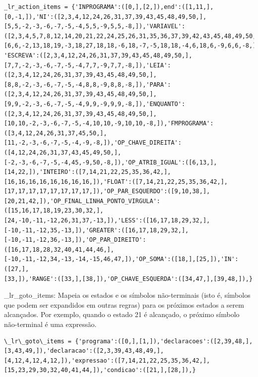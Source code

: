 \documentclass[a4paper,12pt]{article}
\begin{document}
\begin{Verbatim}
_lr_action_items = {'INPROGRAMA':([0,],[2,]),end':([1,11,],
[0,-1,]),'NI':([2,3,4,12,24,26,31,37,39,43,45,48,49,50,],
[5,5,-2,-3,-6,-7,-5,-4,5,5,-9,5,5,-8,]),'VARIAVEL':
([2,3,4,5,7,8,12,14,20,21,22,24,25,26,31,35,36,37,39,42,43,45,48,49,50,],
[6,6,-2,13,18,19,-3,18,27,18,18,-6,18,-7,-5,18,18,-4,6,18,6,-9,6,6,-8,]),
'ESCREVA':([2,3,4,12,24,26,31,37,39,43,45,48,49,50,],
[7,7,-2,-3,-6,-7,-5,-4,7,7,-9,7,7,-8,]),'LEIA':
([2,3,4,12,24,26,31,37,39,43,45,48,49,50,],
[8,8,-2,-3,-6,-7,-5,-4,8,8,-9,8,8,-8,]),'PARA':
([2,3,4,12,24,26,31,37,39,43,45,48,49,50,],
[9,9,-2,-3,-6,-7,-5,-4,9,9,-9,9,9,-8,]),'ENQUANTO':
([2,3,4,12,24,26,31,37,39,43,45,48,49,50,],
[10,10,-2,-3,-6,-7,-5,-4,10,10,-9,10,10,-8,]),'FMPROGRAMA':
([3,4,12,24,26,31,37,45,50,],
[11,-2,-3,-6,-7,-5,-4,-9,-8,]),'OP_CHAVE_DIREITA':
([4,12,24,26,31,37,43,45,49,50,],
[-2,-3,-6,-7,-5,-4,45,-9,50,-8,]),'OP_ATRIB_IGUAL':([6,13,],
[14,22,]),'INTEIRO':([7,14,21,22,25,35,36,42,],
[16,16,16,16,16,16,16,16,]),'FLOAT':([7,14,21,22,25,35,36,42,],
[17,17,17,17,17,17,17,17,]),'OP_PAR_ESQUERDO':([9,10,38,],
[20,21,42,]),'OP_FINAL_LINHA_PONTO_VIRGULA':([15,16,17,18,19,23,30,32,],
[24,-10,-11,-12,26,31,37,-13,]),'LESS':([16,17,18,29,32,],
[-10,-11,-12,35,-13,]),'GREATER':([16,17,18,29,32,],
[-10,-11,-12,36,-13,]),'OP_PAR_DIREITO':([16,17,18,28,32,40,41,44,46,],
[-10,-11,-12,34,-13,-14,-15,46,47,]),'OP_SOMA':([18,],[25,]),'IN':([27,],
[33,]),'RANGE':([33,],[38,]),'OP_CHAVE_ESQUERDA':([34,47,],[39,48,]),}

\end{Verbatim}

\_lr\_goto\_items: Mapeia os estados e os símbolos não-terminais (isto 
é, símbolos que podem ser expandidos em outras regras) para os próximos 
estados a serem alcançados. Por exemplo, quando o estado 21 é alcançado, 
o próximo símbolo não-terminal é uma expressão.
\begin{Verbatim}
\_lr\_goto\_items = {'programa':([0,],[1,]),'declaracoes':([2,39,48,],
[3,43,49,]),'declaracao':([2,3,39,43,48,49,],
[4,12,4,12,4,12,]),'expressao':([7,14,21,22,25,35,36,42,],
[15,23,29,30,32,40,41,44,]),'condicao':([21,],[28,]),}
\end{Verbatim}
\end{document}
